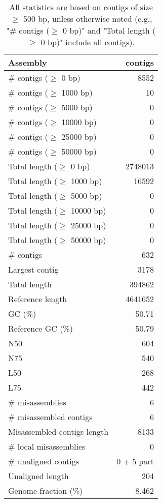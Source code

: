 \documentclass[12pt,a4paper]{article}
\begin{document}
\begin{table}[ht]
\begin{center}
\caption{All statistics are based on contigs of size $\geq$ 500 bp, unless otherwise noted (e.g., "\# contigs ($\geq$ 0 bp)" and "Total length ($\geq$ 0 bp)" include all contigs).}
\begin{tabular}{|l*{1}{|r}|}
\hline
Assembly & contigs \\ \hline
\# contigs ($\geq$ 0 bp) & 8552 \\ \hline
\# contigs ($\geq$ 1000 bp) & 10 \\ \hline
\# contigs ($\geq$ 5000 bp) & 0 \\ \hline
\# contigs ($\geq$ 10000 bp) & 0 \\ \hline
\# contigs ($\geq$ 25000 bp) & 0 \\ \hline
\# contigs ($\geq$ 50000 bp) & 0 \\ \hline
Total length ($\geq$ 0 bp) & 2748013 \\ \hline
Total length ($\geq$ 1000 bp) & 16592 \\ \hline
Total length ($\geq$ 5000 bp) & 0 \\ \hline
Total length ($\geq$ 10000 bp) & 0 \\ \hline
Total length ($\geq$ 25000 bp) & 0 \\ \hline
Total length ($\geq$ 50000 bp) & 0 \\ \hline
\# contigs & 632 \\ \hline
Largest contig & 3178 \\ \hline
Total length & 394862 \\ \hline
Reference length & 4641652 \\ \hline
GC (\%) & 50.71 \\ \hline
Reference GC (\%) & 50.79 \\ \hline
N50 & 604 \\ \hline
N75 & 540 \\ \hline
L50 & 268 \\ \hline
L75 & 442 \\ \hline
\# misassemblies & 6 \\ \hline
\# misassembled contigs & 6 \\ \hline
Misassembled contigs length & 8133 \\ \hline
\# local misassemblies & 0 \\ \hline
\# unaligned contigs & 0 + 5 part \\ \hline
Unaligned length & 204 \\ \hline
Genome fraction (\%) & 8.462 \\ \hline

\end{tabular}
\end{center}
\end{table}
\end{document}
